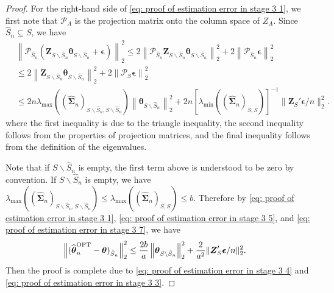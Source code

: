 \documentclass[aos,preprint]{imsart}
\theoremstyle{plain}
\theoremstyle{definition}
\newcommand{\btheta}{\boldsymbol{\theta}}
\newcommand{\bd}[1]{\boldsymbol{#1}}
\newcommand{\idf}{\mathbbm{1}}
\newcommand{\lmin}[1]{\lambda_{\min}\left(#1\right)}
\newcommand{\lmax}[1]{\lambda_{\max}\left(#1\right)}
\newcommand{\ptheta}{\widehat{\boldsymbol{\theta}}^{\textup{OPT}}}
\newcommand{\hdlambda}{\lambda^{\textup{OPT}}}
\newcommand{\bZ}{\boldsymbol{Z}}
\newcommand{\hbSigma}{\hat{\boldsymbol{\Sigma}}}
\newcommand{\bepsilon}{\bd{\epsilon}}
\begin{document}
\begin{appendix}
\begin{proof}
For the right-hand side of \eqref{eq: proof of estimation error in stage 3 1}, we first note that $\mathcal{P}_A$ is the projection matrix onto the column space of $Z_A$.
Since $\hat{S}_n\subseteq S$,  we have 
\begin{equation}\label{eq: proof of estimation error in stage 3 7}
\begin{aligned}
    &\left\|\mathcal{P}_{\hat{S}_n}\left( \bZ_{S\backslash\hat{S}_n}\btheta_{S\backslash\hat{S}_n} + \bepsilon \right)\right\|_2^2 \le 2\left\|\mathcal{P}_{\hat{S}_n}\bZ_{S\backslash\hat{S}_n}\btheta_{S\backslash\hat{S}_n}\right\|_2^2 + 2\left\| \mathcal{P}_{\hat{S}_n}\bepsilon\right\|_2^2
    \\&\le 2\left\|\bZ_{S\backslash\hat{S}_n}\btheta_{S\backslash\hat{S}_n}\right\|_2^2 +2 \left\| \mathcal{P}_{S}\bepsilon\right\|_2^2
    \\&\le 2n\lmax{(\hbSigma_n)_{S\backslash\hat{S}_n, S\backslash\hat{S}_n}} \left\|\btheta_{S\backslash\hat{S}_n} \right\|_2^2 + 2n[\lmin{(\hbSigma_n)_{S,S}}]^{-1}\|\bZ_S'\bepsilon/n\|_2^2.
\end{aligned}    
\end{equation}
where the first inequality is due to the triangle inequality, the second inequality follows from the properties of projection matrices, and the final inequality follows from the definition of the eigenvalues.

Note that if $S \backslash \hat{S}_n$ is empty, the first term above is understood to be zero by convention. If  $S \backslash \hat{S}_n$ is empty, 
we have
$\lmax{(\hbSigma_n)_{S\backslash\hat{S}_n, S\backslash\hat{S}_n}}\le \lmax{(\hbSigma_n)_{S,S}} \leq b$. 
Therefore by \eqref{eq: proof of estimation error in stage 3 1}, \eqref{eq: proof of estimation error in stage 3 5}, and \eqref{eq: proof of estimation error in stage 3 7}, we have 
\begin{equation*}
\begin{aligned}
    \left\|(\ptheta_n-\btheta)_{\hat{S}_n} \right\|_2^2 &\le \frac{2b}{a} \left\|\btheta_{S\backslash\hat{S}_n} \right\|_2^2 + \frac{2}{a^2}\|\bZ_S'\bepsilon/n\|_2^2.
\end{aligned}
\end{equation*}
Then the proof is complete due to \eqref{eq: proof of estimation error in stage 3 4} and \eqref{eq: proof of estimation error in stage 3 3}.
\end{proof}


\end{appendix}
\end{document}
